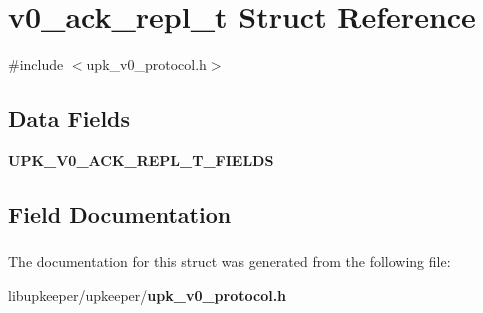 \section{v0\_\-ack\_\-repl\_\-t Struct Reference}
\label{structv0__ack__repl__t}


{\ttfamily \#include $<$upk\_\-v0\_\-protocol.h$>$}

\subsection*{Data Fields}
\begin{DoxyCompactItemize}
\item 
{\bf UPK\_\-V0\_\-ACK\_\-REPL\_\-T\_\-FIELDS}
\end{DoxyCompactItemize}


\subsection{Field Documentation}
\subsubsection[{UPK\_\-V0\_\-ACK\_\-REPL\_\-T\_\-FIELDS}]{}\label{structv0__ack__repl__t_a7c58a51c2a08ec6bc6473595bc2b1d75}


The documentation for this struct was generated from the following file:\begin{DoxyCompactItemize}
\item 
libupkeeper/upkeeper/{\bf upk\_\-v0\_\-protocol.h}\end{DoxyCompactItemize}
